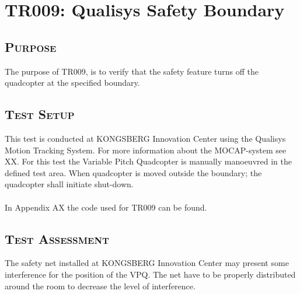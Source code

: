 \newpage


\section{TR009: Qualisys Safety Boundary}
         {}

\subsection*{\textsc{\medium Purpose}}
The purpose of TR009, is to verify that the safety feature turns off the quadcopter at the specified boundary.

\subsection*{\textsc{\medium Test Setup}}
This test is conducted at KONGSBERG Innovation Center using the Qualisys Motion Tracking System. For more information about the MOCAP-system see XX. For this test the Variable Pitch Quadcopter is manually manoeuvred in the defined test area. When quadcopter is moved outside the boundary; the quadcopter shall initiate shut-down.\\
\\
In Appendix AX the code used for TR009 can be found. 

\subsection*{\textsc{\medium Test Assessment}}
The safety net installed at KONGSBERG Innovation Center may present some interference for the position of the VPQ. The net have to be properly distributed around the room to decrease the level of interference.

